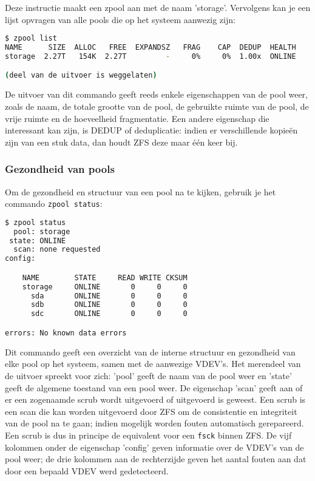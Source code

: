 \clearpage

Deze instructie maakt een zpool aan met de naam 'storage'. Vervolgens kan je een lijst opvragen van alle pools die op het systeem aanwezig zijn:

\begin{lstlisting}[language=bash,style=command_style]
$ zpool list
NAME      SIZE  ALLOC   FREE  EXPANDSZ   FRAG    CAP  DEDUP  HEALTH 
storage  2.27T   154K  2.27T         -     0%     0%  1.00x  ONLINE 

(deel van de uitvoer is weggelaten)

\end{lstlisting}

De uitvoer van dit commando geeft reeds enkele eigenschappen van de pool weer, zoals de naam, de totale grootte van de pool, de gebruikte ruimte van de pool, de vrije ruimte en de hoeveelheid fragmentatie. Een andere eigenschap die interessant kan zijn, is DEDUP of deduplicatie: indien er verschillende kopieën zijn van een stuk data, dan houdt ZFS deze maar één keer bij. 

\subsubsection{Gezondheid van pools}

Om de gezondheid en structuur van een pool na te kijken, gebruik je het commando \texttt{zpool status}:

\begin{lstlisting}[language=bash,style=command_style]
$ zpool status
  pool: storage
 state: ONLINE
  scan: none requested
config:

	NAME        STATE     READ WRITE CKSUM
	storage     ONLINE       0     0     0
	  sda       ONLINE       0     0     0
	  sdb       ONLINE       0     0     0
	  sdc       ONLINE       0     0     0

errors: No known data errors
\end{lstlisting}

Dit commando geeft een overzicht van de interne structuur en gezondheid van elke pool op het systeem, samen met de aanwezige VDEV's. Het merendeel van de uitvoer spreekt voor zich: 'pool' geeft de naam van de pool weer en 'state' geeft de algemene toestand van een pool weer. De eigenschap 'scan' geeft aan of er een zogenaamde scrub wordt uitgevoerd of uitgevoerd is geweest. Een scrub is een scan die kan worden uitgevoerd door ZFS om de consistentie en integriteit van de pool na te gaan; indien mogelijk worden fouten automatisch gerepareerd. Een scrub is dus in principe de equivalent voor een \texttt{fsck} binnen ZFS. De vijf kolommen onder de eigenschap 'config' geven informatie over de VDEV's van de pool weer; de drie kolommen aan de rechterzijde geven het aantal fouten aan dat door een bepaald VDEV werd gedetecteerd.

